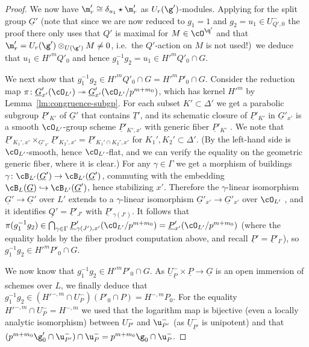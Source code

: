 \documentclass[a4paper]{amsart}
\numberwithin{equation}{section}
\theoremstyle{remark}
\theoremstyle{definition}
\newcommand{\alggrp}[1]{\underline{#1}}
\newcommand{\into}{\hookrightarrow}
\newcommand{\onto}{\twoheadrightarrow}
\begin{document}
\begin{proof}
  We now have $\m_r' \cong \delta_{u_1} \star \m_r'$ as $U_r(\g')$-modules.
  Applying \cite[Theorem 4.7]{OS3} for the split group $\alggrp G'$ (note that since we are now reduced to $g_1 = 1$ and $g_2 = u_1 \in U^-_{Q',0}$ 
  the proof there only uses that $Q'$ is maximal for $M \in \cO^{\q'}$ and that $\m'_r = U_r(\g') \otimes_{U(\g')} M \ne 0$, i.e.\ the $Q'$-action on $M$ is not used!)\ 
  we deduce that $u_1 \in H'^m Q'_0$ and hence $g_1^{-1} g_2 = u_1 \in H'^{m} Q'_0 \cap G$. 

  We next show that $g_1^{-1} g_2 \in H'^{m} Q'_0 \cap G = H'^{m} P'_0 \cap G$. Consider the reduction map $\pi \colon \alggrp G'_{x'}(\cO_{L'}) \onto \alggrp G'_{x'}(\cO_{L'}/p^{m+m_0})$,
  which has kernel $H'^m$ by Lemma~\ref{lm:congruence-subgp}. 
  For each subset $K' \subset \Delta'$ we get a parabolic subgroup $\alggrp P'_{K'}$ of $\alggrp G'$ that contains $\alggrp T'$,
  and its schematic closure of $\alggrp P'_{K'}$ in $\alggrp G'_{x'}$ is a smooth $\cO_{L'}$-group scheme $\alggrp P'_{K',x'}$ with generic fiber $\alggrp P'_{K'}$
  \cite[\S 2.9]{KP}. We note that $\alggrp P'_{K_1',x'} \times_{\alggrp G'_{x'}} \alggrp P'_{K_2',x'} = \alggrp P'_{K_1' \cap K_2',x'}$ for $K_1', K_2' \subset \Delta'$.
  (By \cite[Proposition 2.9.1(4), Proposition 2.9.2]{KP} the left-hand side is $\cO_{L'}$-smooth, hence $\cO_{L'}$-flat, and we can verify
  the equality on the geometric generic fiber, where it is clear.)
  For any $\gamma \in \Gamma$ we get a morphism of buildings $\gamma \colon \cB_{L'}(\alggrp G') \to \cB_{L'}(\alggrp G')$, commuting 
  with the embedding $\cB_L(\alggrp G) \into \cB_{L'}(\alggrp G')$, hence stabilizing $x'$. Therefore the $\gamma$-linear isomorphism
  $\alggrp G' \to \alggrp G'$ over $L'$ extends to a $\gamma$-linear isomorphism
  $\alggrp G'_{x'} \to \alggrp G'_{x'}$ over $\cO_{L'}$ \cite[Corollary 2.8.10]{KP}, and it identifies $\alggrp Q' = \alggrp P'_{J'}$ with $\alggrp P'_{\gamma(J')}$.
  It follows that $\pi(g_1^{-1} g_2) \in \bigcap_{\gamma \in \Gamma} \alggrp P'_{\gamma(J'),x'}(\cO_{L'}/p^{m+m_0}) = \alggrp P'_{x'}(\cO_{L'}/p^{m+m_0})$ 
  (where the equality holds by the fiber product computation above, and recall $\alggrp P' = \alggrp P'_{I'}$),
  so $g_1^{-1} g_2 \in H'^{m} P'_0 \cap G$.

  We now know that $g_1^{-1} g_2 \in H'^{m} P'_0 \cap G$.
  As $\alggrp U_{\alggrp P}^- \times \alggrp P \to \alggrp G$ is an open immersion of schemes over $L$, we finally deduce that $g_1^{-1} g_2 \in (H'^{-,m} \cap U_P^-)(P'_0 \cap P) = H^{-,m} P_0$.
  For the equality $H'^{-,m} \cap U_P^- = H^{-,m}$ we used that the logarithm map is bijective (even a locally analytic isomorphism) between $U_{P'}^-$ and $\u_{P'}^-$
  (as $\alggrp U_{\alggrp P'}^-$ is unipotent) and that $(p^{m+m_0} \g'_0 \cap \u_{P'}^-) \cap \u_P^- = p^{m+m_0} \g_0 \cap \u_P^-$.
\end{proof}
\end{document}
